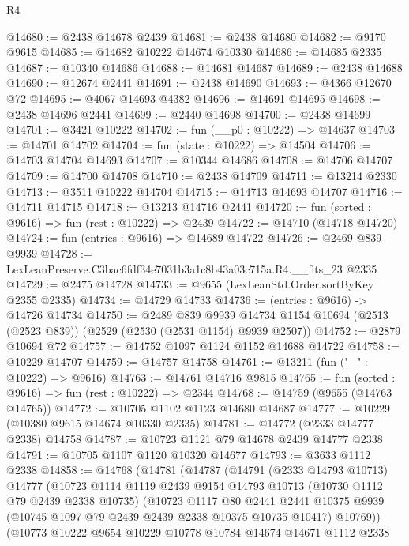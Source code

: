 \begin{lexlean}{R4}
\begin{coremodule}
@14680 := @2438 @14678 @2439
@14681 := @2438 @14680
@14682 := @9170 @9615
@14685 := @14682 @10222 @14674 @10330
@14686 := @14685 @2335
@14687 := @10340 @14686
@14688 := @14681 @14687
@14689 := @2438 @14688
@14690 := @12674 @2441
@14691 := @2438 @14690
@14693 := @4366 @12670 @72
@14695 := @4067 @14693 @4382
@14696 := @14691 @14695
@14698 := @2438 @14696 @2441
@14699 := @2440 @14698
@14700 := @2438 @14699
@14701 := @3421 @10222
@14702 := fun (__p0 : @10222) => @14637
@14703 := @14701 @14702
@14704 := fun (state : @10222) => @14504
@14706 := @14703 @14704 @14693
@14707 := @10344 @14686
@14708 := @14706 @14707
@14709 := @14700 @14708
@14710 := @2438 @14709
@14711 := @13214 @2330
@14713 := @3511 @10222 @14704
@14715 := @14713 @14693 @14707
@14716 := @14711 @14715
@14718 := @13213 @14716 @2441
@14720 := fun (sorted : @9616) => fun (rest : @10222) => @2439
@14722 := @14710 (@14718 @14720)
@14724 := fun (entries : @9616) => @14689 @14722
@14726 := @2469 @839 @9939
@14728 := LexLeanPreserve.C3bac6fdf34e7031b3a1c8b43a03c715a.R4.__fits_23 @2335
@14729 := @2475 @14728
@14733 := @9655 (LexLeanStd.Order.sortByKey @2355 @2335)
@14734 := @14729 @14733
@14736 := (entries : @9616) -> @14726 @14734
@14750 := @2489
    @839
    @9939
    @14734
    @1154
    @10694
    (@2513 (@2523 @839))
    (@2529 (@2530 (@2531 @1154) @9939 @2507))
@14752 := @2879 @10694 @72
@14757 := @14752 @1097 @1124 @1152 @14688 @14722
@14758 := @10229 @14707
@14759 := @14757 @14758
@14761 := @13211 (fun ("_" : @10222) => @9616)
@14763 := @14761 @14716 @9815
@14765 := fun (sorted : @9616) => fun (rest : @10222) => @2344
@14768 := @14759 (@9655 (@14763 @14765))
@14772 := @10705 @1102 @1123 @14680 @14687
@14777 := @10229 (@10380 @9615 @14674 @10330 @2335)
@14781 := @14772 (@2333 @14777 @2338) @14758
@14787 := @10723 @1121 @79 @14678 @2439 @14777 @2338
@14791 := @10705 @1107 @1120 @10320 @14677
@14793 := @3633 @1112 @2338
@14858 := @14768
    (@14781
      (@14787
        (@14791
          (@2333 @14793 @10713)
          @14777
          (@10723
            @1114
            @1119
            @2439
            @9154
            @14793
            @10713
            (@10730 @1112 @79 @2439 @2338 @10735)
            (@10723
              @1117
              @80
              @2441
              @2441
              @10375
              @9939
              (@10745 @1097 @79 @2439 @2439 @2338 @10375 @10735 @10417)
              @10769))
          (@10773
            @10222
            @9654
            @10229
            @10778
            @10784
            @14674
            @14671
            @1112
            @2338

\end{coremodule}
\end{lexlean}
